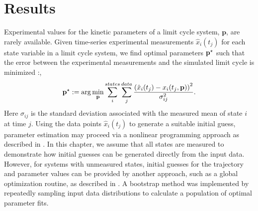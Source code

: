 {\section{Results}

Experimental values for the kinetic parameters of a limit cycle system, $\bm p$, are rarely available. 
Given time-series experimental measurements $\hat{x}_i(t_j)$ for each state variable in a limit cycle system, we find optimal parameters ${\mathbf{p}}^\star$ such that the error between the experimental measurements and the simulated limit cycle is minimized \cite{Bock2007}:,
\begin{equation} \label{eq:cost1}
  {\mathbf{p}}^\star := \arg\min_{\mathbf{p}} \sum_i^{states} \sum_j^{data} \frac{\left(\hat{x}_i(t_j) - x_i(t_j,{\mathbf{p}})\right)^2}{ {\sigma}_{ij}^2}.
\end{equation}
Here ${\sigma}_{ij}$ is the standard deviation associated with the measured mean of state $i$ at time $j$. 
Using the data points $\hat{x}_i(t_j)$ to generate a suitable initial guess, parameter estimation may proceed via a nonlinear programming approach as described in . 
In this chapter, we assume that all states are measured to demonstrate how initial guesses can be generated directly from the input data. 
However, for systems with unmeasured states, initial guesses for the trajectory and parameter values can be provided by another approach, such as a global optimization routine, as described in . 
A bootstrap method was implemented by repeatedly sampling input data distributions to calculate a population of optimal parameter fits.

}
